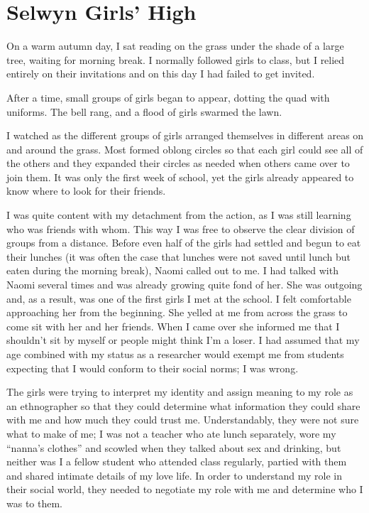 \section{Selwyn Girls' High}
On a warm autumn day, I sat reading on the grass under the shade of a large tree, waiting for morning break. I normally followed girls to class, but I relied entirely on their invitations and on this day I had failed to get invited. 


After a time, small groups of girls began to appear, dotting the quad with uniforms. The bell rang, and a flood of girls swarmed the lawn. 

I watched as the different groups of girls arranged themselves in different areas on and around the grass. Most formed oblong circles so that each girl could see all of the others and they expanded their circles as needed when others came over to join them. It was only the first week of school, yet the girls already appeared to know where to look for their friends. 

I was quite content with my detachment from the action, as I was still learning who was friends with whom. This way I was free to observe the clear division of groups from a distance. Before even half of the girls had settled and begun to eat their lunches (it was often the case that lunches were not saved until lunch but eaten during the morning break), Naomi called out to me. I had talked with Naomi several times and was already growing quite fond of her. She was outgoing and, as a result, was one of the first girls I met at the school. I felt comfortable approaching her from the beginning. She yelled at me from across the grass to come sit with her and her friends. When I came over she informed me that I shouldn't sit by myself or people might think I'm a loser. I had assumed that my age combined with my status as a researcher would exempt me from students expecting that I would conform to their social norms; I was wrong.

The girls were trying to interpret my identity and assign meaning to my role as an ethnographer so that they could determine what information they could share with me and how much they could trust me. Understandably, they were not sure what to make of me; I was not a teacher who ate lunch separately, wore my ``nanna's clothes'' and scowled when they talked about sex and drinking, but neither was I a fellow student who attended class regularly, partied with them and shared intimate details of my love life. In order to understand my role in their social world, they needed to negotiate my role with me and determine who I was to them.

